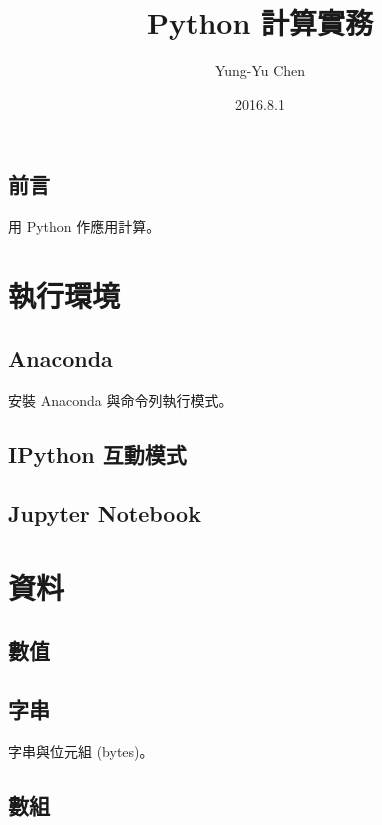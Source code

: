 \documentclass[a4paper,12pt]{book}
\begin{document}
\title{Python 計算實務}
\author{Yung-Yu Chen}
\date{2016.8.1}

\maketitle

\tableofcontents

\hspace{.5cm}

\frontmatter

\chapter*{前言}

用 Python 作應用計算。

\mainmatter

\part{執行環境}

\chapter{Anaconda}

安裝 Anaconda 與命令列執行模式。

\chapter{IPython 互動模式}

\chapter{Jupyter Notebook}

\part{資料}

\chapter{數值}

\chapter{字串}

字串與位元組 (bytes)。

\chapter{數組}
\end{document}
